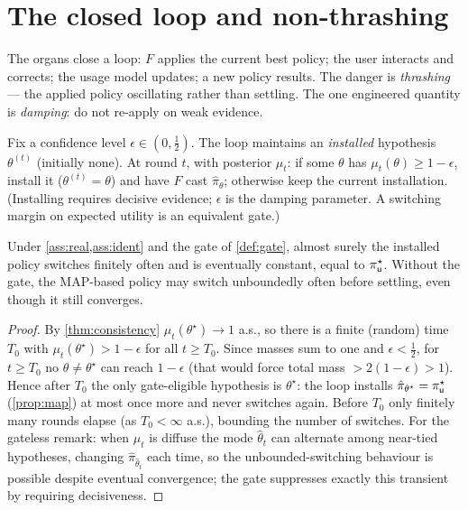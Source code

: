 \documentclass[../uxoxo-main]{subfiles}
\begin{document}
\section{The closed loop and non-thrashing}\label{sec:loop}
The organs close a loop: $F$ applies the current best policy; the user interacts
and corrects; the usage model updates; a new policy results. The danger is
\emph{thrashing} --- the applied policy oscillating rather than settling. The one
engineered quantity is \emph{damping}: do not re-apply on weak evidence.

\begin{definition}\label{def:gate}
Fix a confidence level $\epsilon\in(0,\tfrac12)$. The loop maintains an
\emph{installed} hypothesis $\theta^{(t)}$ (initially none). At round $t$, with
posterior $\mu_t$: if some $\theta$ has $\mu_t(\theta)\ge1-\epsilon$, install it
($\theta^{(t)}=\theta$) and have $F$ cast $\hat\pi_\theta$; otherwise keep the
current installation. (Installing requires decisive evidence; $\epsilon$ is the
damping parameter. A switching margin on expected utility is an equivalent gate.)
\end{definition}

\begin{theorem}\label{thm:nothrash}
Under \cref{ass:real,ass:ident} and the gate of \cref{def:gate}, almost surely
the installed policy switches finitely often and is eventually constant, equal to
$\pi^\star_{\mathsf{u}}$. Without the gate, the MAP-based policy may switch unboundedly
often before settling, even though it still converges.
\end{theorem}

\begin{proof}
By \cref{thm:consistency} $\mu_t(\theta^\star)\to1$ a.s., so there is a finite
(random) time $T_0$ with $\mu_t(\theta^\star)>1-\epsilon$ for all $t\ge T_0$.
Since masses sum to one and $\epsilon<\tfrac12$, for $t\ge T_0$ no
$\theta\ne\theta^\star$ can reach $1-\epsilon$ (that would force total mass
$>2(1-\epsilon)>1$). Hence after $T_0$ the only gate-eligible hypothesis is
$\theta^\star$: the loop installs $\hat\pi_{\theta^\star}=\pi^\star_{\mathsf{u}}$
(\cref{prop:map}) at most once more and never switches again. Before $T_0$ only
finitely many rounds elapse (as $T_0<\infty$ a.s.), bounding the number of
switches. For the gateless remark: when $\mu_t$ is diffuse the mode
$\hat\theta_t$ can alternate among near-tied hypotheses, changing
$\hat\pi_{\hat\theta_t}$ each time, so the unbounded-switching behaviour is
possible despite eventual convergence; the gate suppresses exactly this transient
by requiring decisiveness.
\end{proof}
\end{document}

